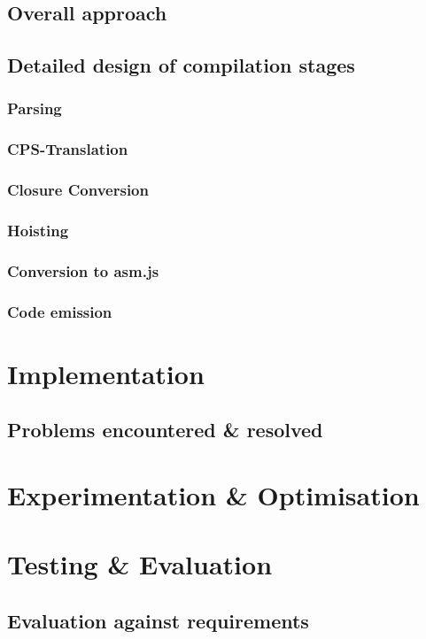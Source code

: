 \documentclass[11pt]{report}
\begin{document}
\section{Overall approach}
\section{Detailed design of compilation stages}
\subsection{Parsing}
\subsection{CPS-Translation}
\subsection{Closure Conversion}
\subsection{Hoisting}
\subsection{Conversion to asm.js}
\subsection{Code emission}

\chapter{Implementation}
\section{Problems encountered \& resolved}

\chapter{Experimentation \& Optimisation}

\chapter{Testing \& Evaluation}
\section{Evaluation against requirements}
\end{document}

